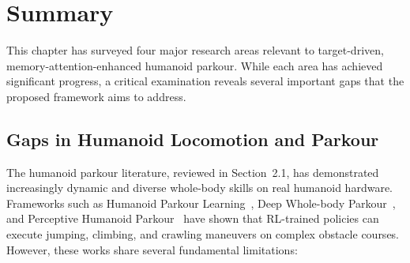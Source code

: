 \section{Summary}
\label{sec:rw_summary}

This chapter has surveyed four major research areas relevant to target-driven, memory-attention-enhanced humanoid parkour. While each area has achieved significant progress, a critical examination reveals several important gaps that the proposed framework aims to address.

\subsection{Gaps in Humanoid Locomotion and Parkour}

The humanoid parkour literature, reviewed in Section~2.1, has demonstrated increasingly dynamic and diverse whole-body skills on real humanoid hardware. Frameworks such as Humanoid Parkour Learning~\cite{zhuang2024humanoidparkour}, Deep Whole-body Parkour~\cite{zhuang2024deepwholebody}, and Perceptive Humanoid Parkour~\cite{wu2024perceptiveparkour} have shown that RL-trained policies can execute jumping, climbing, and crawling maneuvers on complex obstacle courses. However, these works share several fundamental limitations:


